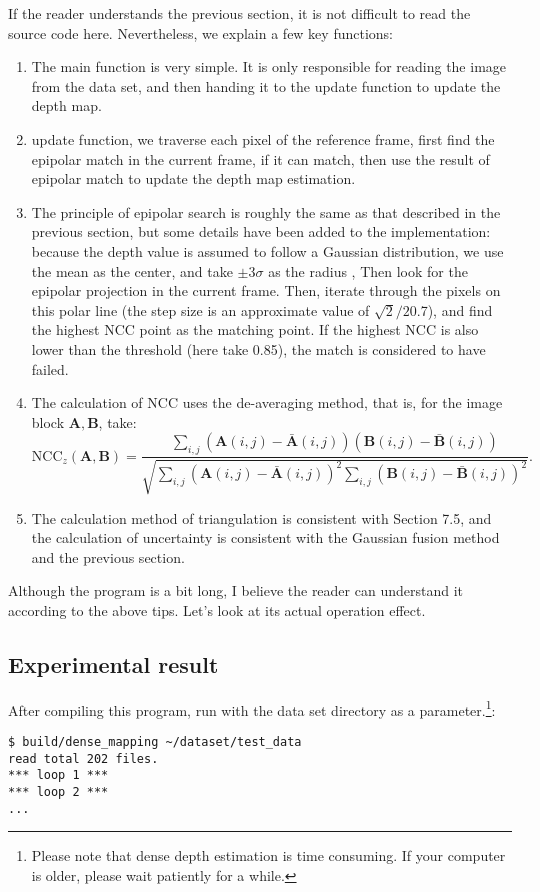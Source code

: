 If the reader understands the previous section, it is not difficult to read the source code here. Nevertheless, we explain a few key functions:

\begin{enumerate}
	\item The main function is very simple. It is only responsible for reading the image from the data set, and then handing it to the update function to update the depth map.
	\item update function, we traverse each pixel of the reference frame, first find the epipolar match in the current frame, if it can match, then use the result of epipolar match to update the depth map estimation.
	\item The principle of epipolar search is roughly the same as that described in the previous section, but some details have been added to the implementation: because the depth value is assumed to follow a Gaussian distribution, we use the mean as the center, and take $ \pm 3 \sigma $ as the radius , Then look for the epipolar projection in the current frame. Then, iterate through the pixels on this polar line (the step size is an approximate value of $ \sqrt{2} /2$0.7), and find the highest NCC point as the matching point. If the highest NCC is also lower than the threshold (here take 0.85), the match is considered to have failed.
	\item The calculation of NCC uses the de-averaging method, that is, for the image block $ \bm{A}, \bm{B} $, take:
	\begin{equation}
		\mathrm{NCC}_{z} (\bm{A}, \bm{B}) = \frac{{\sum\limits_{i,j} {\left( {\bm{A}(i,j) - \bm{\bar{ A}}(i,j)} \right)\left( {\bm{B}(i,j) - \bm{\bar {B}}(i,j)} \right)} }}{{\sqrt {\sum\limits_{i,j} {{{\left( {\bm{A}(i,j) - \bm{\bar {A}}(i,j)} \right)}^2}} \sum\limits_{i,j} {{{\left( {\bm{B}(i,j) - \bm{\bar {B}}(i,j)} \right)}^2}} } }}.
	\end{equation}
	\item The calculation method of triangulation is consistent with Section 7.5, and the calculation of uncertainty is consistent with the Gaussian fusion method and the previous section.
	\end{enumerate}

Although the program is a bit long, I believe the reader can understand it according to the above tips. Let's look at its actual operation effect.

\subsection *{Experimental result}
After compiling this program, run with the data set directory as a parameter.\footnote{Please note that dense depth estimation is time consuming. If your computer is older, please wait patiently for a while. }:
\begin{lstlisting}
$ build/dense_mapping ~/dataset/test_data 
read total 202 files.
*** loop 1 ***
*** loop 2 ***
...
\end{lstlisting}

